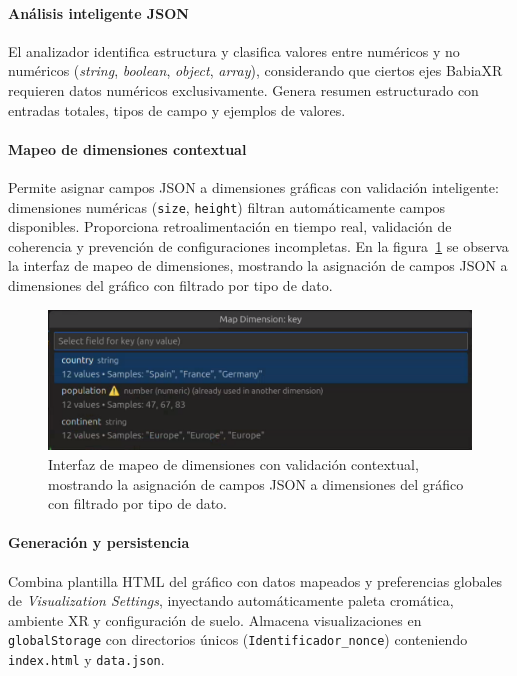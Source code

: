 \documentclass[a4paper, 12pt]{book}
\begin{document}
\paragraph{Análisis inteligente JSON}
El analizador identifica estructura y clasifica valores entre numéricos y no numéricos (\emph{string}, \emph{boolean}, \emph{object}, \emph{array}), considerando que ciertos ejes BabiaXR requieren datos numéricos exclusivamente. Genera resumen estructurado con entradas totales, tipos de campo y ejemplos de valores.

\paragraph{Mapeo de dimensiones contextual}
Permite asignar campos JSON a dimensiones gráficas con validación inteligente: dimensiones numéricas (\texttt{size}, \texttt{height}) filtran automáticamente campos disponibles. Proporciona retroalimentación en tiempo real, validación de coherencia y prevención de configuraciones incompletas. En la figura~\ref{fig:ui-dimension-mapping-process} se observa la interfaz de mapeo de dimensiones, mostrando la asignación de campos JSON a dimensiones del gráfico con filtrado por tipo de dato.

\begin{figure}[H]
\centering
\includegraphics[width=0.80\linewidth]{img/ui-dimension-mapping-process.png}
\caption{Interfaz de mapeo de dimensiones con validación contextual, mostrando la asignación de campos JSON a dimensiones del gráfico con filtrado por tipo de dato.}
\label{fig:ui-dimension-mapping-process}
\end{figure}

\paragraph{Generación y persistencia}
Combina plantilla HTML del gráfico con datos mapeados y preferencias globales de \emph{Visualization Settings}, inyectando automáticamente paleta cromática, ambiente XR y configuración de suelo. Almacena visualizaciones en \texttt{globalStorage} con directorios únicos (\texttt{Identificador\_{nonce}}) conteniendo \texttt{index.html} y \texttt{data.json}.
\end{document}
